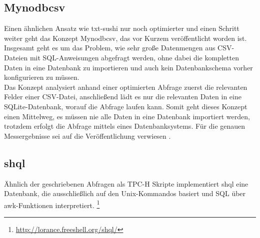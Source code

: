 \subsection{Mynodbcsv}
Einen ähnlichen Ansatz wie txt-sushi nur noch optimierter und einen Schritt weiter geht das Konzept Mynodbcsv, das vor Kurzem veröffentlicht worden ist.
Insgesamt geht es um das Problem, wie sehr große Datenmengen aus CSV-Dateien mit SQL-Anweisungen abgefragt werden, ohne dabei die kompletten Daten in eine Datenbank zu importieren und auch kein Datenbankschema vorher konfigurieren zu müssen.\\
Das Konzept analysiert anhand einer optimierten Abfrage zuerst die relevanten Felder einer CSV-Datei, anschließend lädt es nur die relevanten Daten in eine SQLite-Datenbank, worauf die Abfrage laufen kann. Somit geht dieses Konzept einen Mittelweg, es müssen nie alle Daten in eine Datenbank importiert werden, trotzdem erfolgt die Abfrage mittels eines Datenbanksystems. Für die genauen Messergebnisse sei auf die Veröffentlichung verwiesen \cite{Mynodbcsv}.

\subsection{shql}
Ähnlich der geschriebenen Abfragen als TPC-H Skripte implementiert shql eine Datenbank, die ausschließlich auf den Unix-Kommandos basiert und SQL über awk-Funktionen interpretiert.
\footnote{\url{http://lorance.freeshell.org/shql/}}
